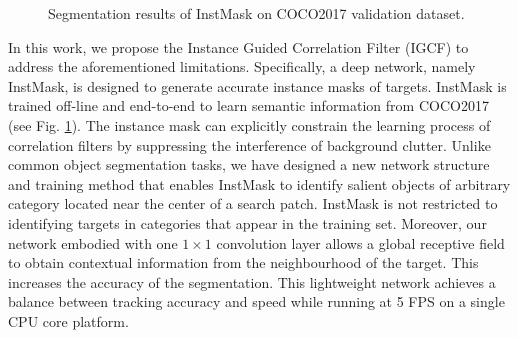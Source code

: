 \begin{figure}
                       \hspace{-0.6em}
                       \hspace{-0.6em}
    \caption{Segmentation results of InstMask on COCO2017 \cite{COCO} validation dataset.}
    \label{fig:InstMask}
\end{figure}

In this work, we propose the Instance Guided Correlation Filter (IGCF) to address the aforementioned limitations. Specifically, a deep network, namely InstMask, is designed to generate accurate instance masks of targets. InstMask is trained off-line and end-to-end to learn semantic information from COCO2017\cite{COCO} (see Fig. \ref{fig:InstMask}). The instance mask can explicitly constrain the learning process of correlation filters by suppressing the interference of background clutter. 
Unlike common object segmentation tasks, we have designed a new network structure and training method that enables InstMask to identify salient objects of arbitrary category located near the center of a search patch. InstMask is not restricted to identifying targets in categories that appear in the training set. Moreover, our network embodied with one $1 \times 1$ convolution layer allows a global receptive field to obtain contextual information from the neighbourhood of the target. This increases the accuracy of the segmentation. This lightweight network achieves a balance between tracking accuracy and speed while running at 5 FPS on a single CPU core platform. 

